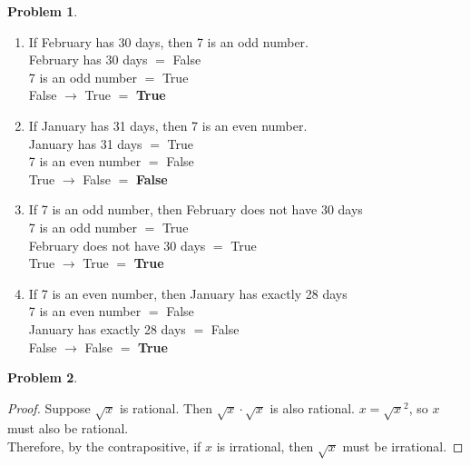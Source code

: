 \documentclass[11pt]{article}
\theoremstyle{definition}
\theoremstyle{case}
\theoremstyle{theorem}
\newtheorem{prob}{Problem}
\begin{document}
\newpage

\begin{prob}\end{prob}
\begin{enumerate}[label=(\alph*)]
\item
If February has 30 days, then 7 is an odd number. \\
February has 30 days $=$ False \\
7 is an odd number $=$ True \\
False $\rightarrow$ True $=$ \textbf{True}

\item
If January has 31 days, then 7 is an even number. \\
January has 31 days $=$ True \\
7 is an even number $=$ False \\
True $\rightarrow$ False $=$ \textbf{False}

\item
If 7 is an odd number, then February does not have 30 days \\
7 is an odd number $=$ True \\
February does not have 30 days $=$ True \\
True $\rightarrow$ True $=$ \textbf{True}

\item
If 7 is an even number, then January has exactly 28 days \\
7 is an even number $=$ False \\
January has exactly 28 days $=$ False \\
False $\rightarrow$ False $=$ \textbf{True}
\end{enumerate}

\begin{prob}\end{prob}
\begin{proof}
Suppose $\sqrt{x}$ is rational. Then $\sqrt{x} \cdot \sqrt{x}$ is also rational. $x = \sqrt{x}^{2}$, so $x$ must also be rational. \\
Therefore, by the contrapositive, if $x$ is irrational, then $\sqrt{x}$ must be irrational.

\end{proof}

\newpage
\end{document}
